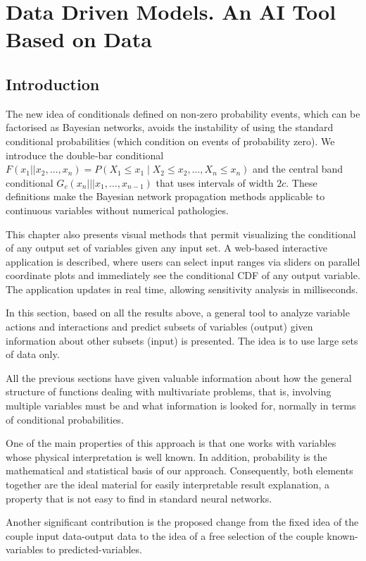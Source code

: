 \startcontents[chapter]
\chapter{Data Driven Models. An AI Tool Based on Data}
\label{ch:newaitool}
\minitocboxed

\section*{Introduction}
The new idea of conditionals defined on non‑zero probability events, which can be factorised as Bayesian networks, avoids the instability of using the standard conditional probabilities (which condition on events of probability zero). We introduce the double‑bar conditional $F(x_1||x_2,\ldots,x_n) = P(X_1\le x_1\mid X_2\le x_2,\ldots,X_n\le x_n)$ and the central band conditional $G_c(x_n ||| x_1,\ldots,x_{n-1})$ that uses intervals of width $2c$. These definitions make the Bayesian network propagation methods applicable to continuous variables without numerical pathologies.

This chapter also presents visual methods that permit visualizing the conditional of any output set of variables given any input set. A web‑based interactive application is described, where users can select input ranges via sliders on parallel coordinate plots and immediately see the conditional CDF of any output variable. The application updates in real time, allowing sensitivity analysis in milliseconds.

In this section, based on all the results above, a general tool to analyze variable actions and interactions and predict subsets of variables (output) given information about other subsets (input) is presented. The idea is to use large sets of data only.

All the previous sections have given valuable information about how the general structure of functions dealing with multivariate problems, that is, involving multiple variables must be and what information is looked for, normally in terms of conditional probabilities.

One of the main properties of this approach is that one works with variables whose physical interpretation is well known. In addition, probability is the mathematical and statistical basis of our approach. Consequently, both elements together are the ideal material for easily interpretable result explanation, a property that is not easy to find in standard neural networks.

Another significant contribution is the proposed change from the fixed idea of the couple input data-output data to the idea of a free selection of the couple known-variables to predicted-variables.

